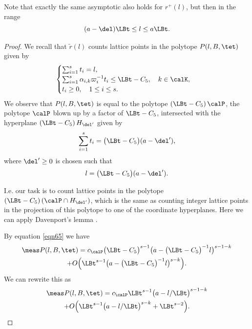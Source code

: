 \begin{remark}
Note that exactly the same asymptotic also holds for $r^+(l)$, but then in the range\vspace*{-3pt}
\[
(a-\del) \LBt \leq l\leq a \LBt.
\]
\end{remark}

\begin{proof}
We recall that $\tilde{r}(l)$ counts lattice points in the polytope $P(l,B,\tet)$ given by\vspace*{-3pt}
\[
\begin{cases}
\sum_{i=1}^s t_i=l,\\
\sum_{i=1}^s \alpha_{i,k} \varpi_i^{-1}t_i \leq \LBt- C_5 ,\quad k\in \calK,\\
t_i\geq 0,\quad 1\leq i\leq s.
\end{cases}
\]
We observe that $P(l,B,\tet)$ is equal to the polytope $\left(\LBt -C_5\right)\calP$, \ie the polytope $\calP$ blown up by a factor of $\LBt-C_5$, intersected with the hyperplane $\left(\LBt -C_5\right) H_{\del'}$ given by\vspace*{-3pt}
\[
\sum_{i=1}^s t_i= \bigl(\LBt -C_5\bigr) (a-\del'),
\]
where $\del' \geq 0$ is chosen such that\vspace*{-3pt}
\[
l= \bigl(\LBt -C_5\bigr) (a-\del').
\]

I.e. our task is to count lattice points in the polytope $\left(\LBt -C_5\right)(\calP\cap H_{\del'})$, which is the same as counting integer lattice points in the projection of this polytope to one of the coordinate hyperplanes. Here we can apply Davenport's lemma \cite{davenport}.

By equation \eqref{eqn65} we have\vspace*{-3pt}
\begin{multline*}
\meas P(l,B,\tet)= c_{\calP} \bigl(\LBt-C_5\bigr)^{s-1} \bigl(a- \bigl(\LBt-C_5\bigr)^{-1}l\bigr)^{s-1-k} \\
+O\Bigl(\LBt^{s-1} \bigl(a-\bigl(\LBt-C_5\bigr)^{-1}l\bigr)^{s-k}\Bigr).
\end{multline*}
We can rewrite this as\vspace*{-3pt}
\begin{multline*}
\meas P(l,B,\tet)= c_{\calP} \LBt^{s-1} \bigl(a-l/{\LBt}\bigr)^{s-1-k} \\
+O\Bigl(\LBt^{s-1} \bigl(a-l/{\LBt}\bigr)^{s-k} + \LBt^{s-2}\Bigr).
\end{multline*}


\end{proof}
